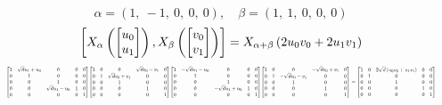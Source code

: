 \documentclass[11pt]{article}
\theoremstyle{definition}
\begin{document}
\[
\alpha = \left( 1, \  -1, \  0, \  0, \  0\right), \quad \beta = \left( 1, \  1, \  0, \  0, \  0\right)
\]
\[
\scaletoalign{\textwidth}{\left[ X_{\alpha}\left(\left[\begin{matrix}u_{0}\\u_{1}\end{matrix}\right]\right), X_{\beta}\left(\left[\begin{matrix}v_{0}\\v_{1}\end{matrix}\right]\right) \right] = X_{\alpha + \beta}\left(2 u_{0} v_{0} + 2 u_{1} v_{1}\right)}
\]
\[
\scaletoalign{\textwidth}{{\left[\begin{matrix}1 & \sqrt{d} u_{1} + u_{0} & 0 & 0 & 0\\0 & 1 & 0 & 0 & 0\\0 & 0 & 1 & 0 & 0\\0 & 0 & \sqrt{d} u_{1} - u_{0} & 1 & 0\\0 & 0 & 0 & 0 & 1\end{matrix}\right]} {\left[\begin{matrix}1 & 0 & 0 & \sqrt{d} v_{0} - v_{1} & 0\\0 & 1 & \sqrt{d} v_{0} + v_{1} & 0 & 0\\0 & 0 & 1 & 0 & 0\\0 & 0 & 0 & 1 & 0\\0 & 0 & 0 & 0 & 1\end{matrix}\right]} {\left[\begin{matrix}1 & - \sqrt{d} u_{1} - u_{0} & 0 & 0 & 0\\0 & 1 & 0 & 0 & 0\\0 & 0 & 1 & 0 & 0\\0 & 0 & - \sqrt{d} u_{1} + u_{0} & 1 & 0\\0 & 0 & 0 & 0 & 1\end{matrix}\right]} {\left[\begin{matrix}1 & 0 & 0 & - \sqrt{d} v_{0} + v_{1} & 0\\0 & 1 & - \sqrt{d} v_{0} - v_{1} & 0 & 0\\0 & 0 & 1 & 0 & 0\\0 & 0 & 0 & 1 & 0\\0 & 0 & 0 & 0 & 1\end{matrix}\right]} = {\left[\begin{matrix}1 & 0 & 2 \sqrt{d} \left(u_{0} v_{0} + u_{1} v_{1}\right) & 0 & 0\\0 & 1 & 0 & 0 & 0\\0 & 0 & 1 & 0 & 0\\0 & 0 & 0 & 1 & 0\\0 & 0 & 0 & 0 & 1\end{matrix}\right]}}
\]
\end{document}
